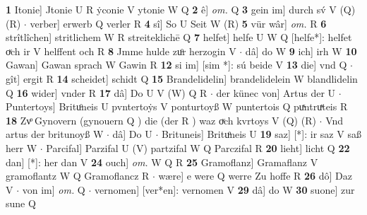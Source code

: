 \documentclass[8pt,a4paper,notitlepage]{article}
\begin{document}
\begin{table}[ht]
\begin{minipage}[t]{0.5\linewidth}
\textbf{1} Itonie] Jtonie U R ẏconie V ytonie W Q \textbf{2} ê] \textit{om.} Q \textbf{3} gein im] durch sv́ V (Q) (R)  $\cdot$ verber] erwerb Q verler R \textbf{4} sî] So U Seit W (R) \textbf{5} vür wâr] \textit{om.} R \textbf{6} strîtlîchen] stritlichem W R streiteklichē Q \textbf{7} helfet] helfe U W Q [helfe*]: helfet oͮch ir V helffent och R \textbf{8} Jmme hulde zuͦr herzogin V  $\cdot$ dâ] do W \textbf{9} ich] irh W \textbf{10} Gawan] Gawan sprach W Gawin R \textbf{12} si im] [sim *]: sú beide V \textbf{13} die] vnd Q  $\cdot$ gît] ergit R \textbf{14} scheidet] schidt Q \textbf{15} Brandelidelin] brandelidelein W blandlidelin Q \textbf{16} wider] vnder R \textbf{17} dâ] Do U V (W) Q R  $\cdot$ der künec von] Artus der U  $\cdot$ Puntertoys] Brituͦneis U pvntertoẏs V ponturtoyß W puntertois Q puͯntruͯteis R \textbf{18} Zvͦ Gynovern (gynouern Q ) die (der R ) waz oͮch kvrtoys V (Q) (R)  $\cdot$ Vnd artus der britunoyß W  $\cdot$ dâ] Do U  $\cdot$ Brituneis] Brituͦneis U \textbf{19} saz] [*]: ir saz V saß herr W  $\cdot$ Parcifal] Parzifal U (V) partzifal W Q Parczifal R \textbf{20} lieht] licht Q \textbf{22} dan] [*]: her dan V \textbf{24} ouch] \textit{om.} W Q R \textbf{25} Gramoflanz] Gramaflanz V gramoflantz W Q Gramoflancz R  $\cdot$ wære] e were Q werre Zu hoffe R \textbf{26} dô] Daz V  $\cdot$ von im] \textit{om.} Q  $\cdot$ vernomen] [ver*en]: vernomen V \textbf{29} dâ] do W \textbf{30} suone] zur sune Q \newline
\end{minipage}
\end{table}
\end{document}
